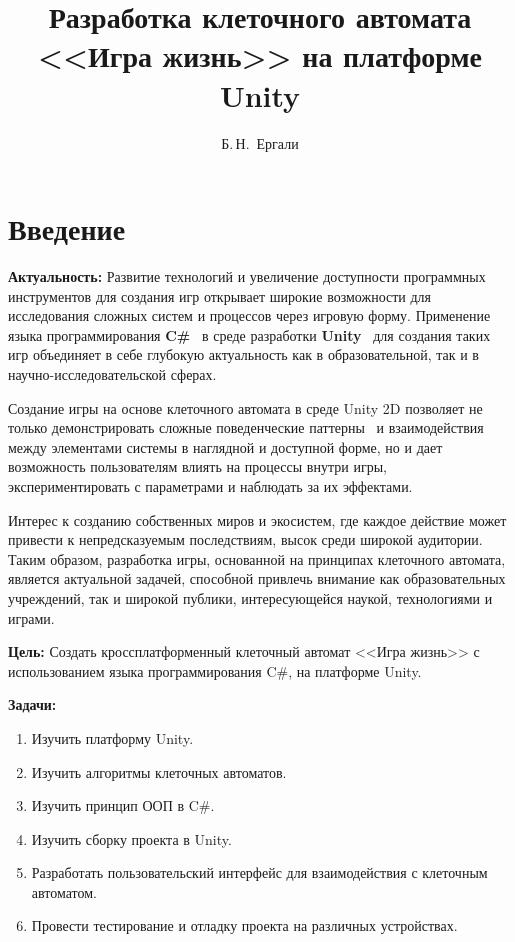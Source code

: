 \documentclass[14pt, oneside]{altsu-report}
\title{Разработка клеточного автомата <<Игра жизнь>> на платформе Unity}
\author{Б.\,Н.~Ергали}
\institute{Институт цифровых технологий, электроники и физики}
\date{\the\year}
\begin{document}
\maketitle

\setcounter{page}{2}
\makeabstract
\tableofcontents

\chapter*{Введение}

\textbf{Актуальность:}
Развитие технологий и увеличение доступности программных инструментов для создания игр открывает широкие возможности для исследования сложных систем и процессов через игровую форму. Применение языка программирования \textbf{C\#}~\cite{Cbib} в среде разработки \textbf{Unity}~\cite{un} для создания таких игр объединяет в себе глубокую актуальность как в образовательной, так и в научно-исследовательской сферах.

Создание игры на основе клеточного автомата в среде Unity 2D позволяет не только демонстрировать сложные поведенческие паттерны~\cite{convPat} и взаимодействия между элементами системы в наглядной и доступной форме, но и дает возможность пользователям влиять на процессы внутри игры, экспериментировать с параметрами и наблюдать за их эффектами.

Интерес к созданию собственных миров и экосистем, где каждое действие может привести к непредсказуемым последствиям, высок среди широкой аудитории. Таким образом, разработка игры, основанной на принципах клеточного автомата, является актуальной задачей, способной привлечь внимание как образовательных учреждений, так и широкой публики, интересующейся наукой, технологиями и играми.

\textbf{Цель:}
Создать кроссплатформенный клеточный автомат <<Игра жизнь>> с использованием языка программирования C\#, на платформе Unity.


\textbf{\label{zadachi}Задачи:}
\begin{enumerate}
	\item Изучить платформу Unity.
	\item Изучить алгоритмы клеточных автоматов.
	\item Изучить принцип ООП в C\#.
	\item Изучить сборку проекта в Unity.
        \item Разработать пользовательский интерфейс для взаимодействия с клеточным автоматом.
        \item Провести тестирование и отладку проекта на различных устройствах.
\end{enumerate}
\end{document}
